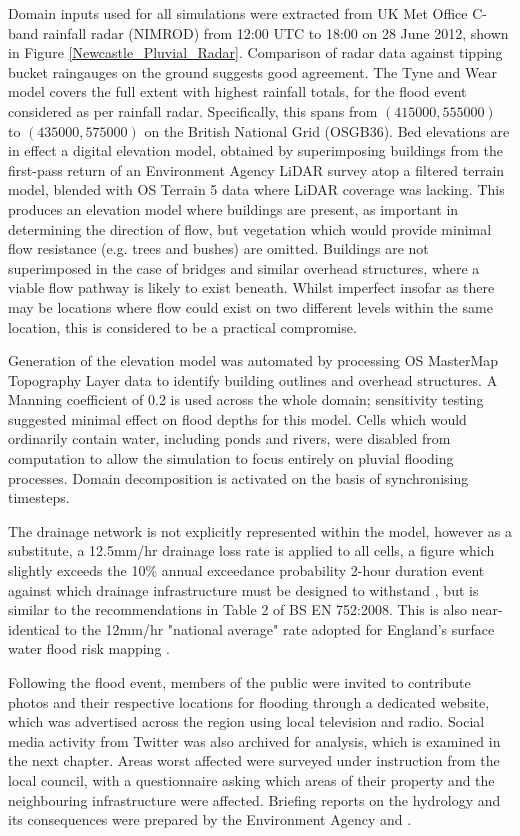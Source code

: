 Domain inputs used for all simulations were extracted from UK Met Office C-band rainfall radar (NIMROD) from 12:00 UTC to 18:00 on 28 June 2012, shown in Figure \ref{Newcastle_Pluvial_Radar}. Comparison of radar data against tipping bucket raingauges on the ground suggests good agreement. The Tyne and Wear model covers the full extent with highest rainfall totals, for the flood event considered as per rainfall radar. Specifically, this spans from $(415000, 555000)$ to $(435000, 575000)$ on the British National Grid (OSGB36). Bed elevations are in effect a digital elevation model, obtained by superimposing buildings from the first-pass return of an Environment Agency LiDAR survey atop a filtered terrain model, blended with OS Terrain 5 data where LiDAR coverage was lacking. This produces an elevation model where buildings are present, as important in determining the direction of flow, but vegetation which would provide minimal flow resistance (e.g. trees and bushes) are omitted. Buildings are not superimposed in the case of bridges and similar overhead structures, where a viable flow pathway is likely to exist beneath. Whilst imperfect insofar as there may be locations where flow could exist on two different levels within the same location, this is considered to be a practical compromise.

Generation of the elevation model was automated by processing OS MasterMap Topography Layer data to identify building outlines and overhead structures. A Manning coefficient of 0.2 is used across the whole domain; sensitivity testing suggested minimal effect on flood depths for this model. Cells which would ordinarily contain water, including ponds and rivers, were disabled from computation to allow the simulation to focus entirely on pluvial flooding processes. Domain decomposition is activated on the basis of synchronising timesteps.

The drainage network is not explicitly represented within the model, however as a substitute, a 12.5mm/hr drainage loss rate is applied to all cells, a figure which slightly exceeds the 10\% annual exceedance probability 2-hour duration event against which drainage infrastructure must be designed to withstand \citep{DMRB2016}, but is similar to the recommendations in Table 2 of BS EN 752:2008. This is also near-identical to the 12mm/hr "national average" rate adopted for England's surface water flood risk mapping \citep{EnvironmentAgency2013}.

Following the flood event, members of the public were invited to contribute photos and their respective locations for flooding through a dedicated website, which was advertised across the region using local television and radio. Social media activity from Twitter was also archived for analysis, which is examined in the next chapter. Areas worst affected were surveyed under instruction from the local council, with a questionnaire asking which areas of their property and the neighbouring infrastructure were affected. Briefing reports on the hydrology and its consequences were prepared by the Environment Agency and \citet{EnvironmentAgency2012a,NewcastleCityCouncil2013}.

